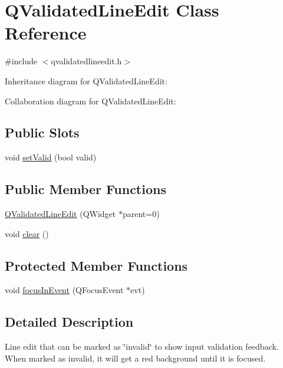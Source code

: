 \hypertarget{class_q_validated_line_edit}{}\section{Q\+Validated\+Line\+Edit Class Reference}
\label{class_q_validated_line_edit}


{\ttfamily \#include $<$qvalidatedlineedit.\+h$>$}



Inheritance diagram for Q\+Validated\+Line\+Edit\+:


Collaboration diagram for Q\+Validated\+Line\+Edit\+:
\subsection*{Public Slots}
\begin{DoxyCompactItemize}
\item 
void \hyperlink{class_q_validated_line_edit_ad9984e2e463cc7fbf28fe334498a1df5}{set\+Valid} (bool valid)
\end{DoxyCompactItemize}
\subsection*{Public Member Functions}
\begin{DoxyCompactItemize}
\item 
\hyperlink{class_q_validated_line_edit_a1d739b7cf9a4ed066bb73decf374293f}{Q\+Validated\+Line\+Edit} (Q\+Widget $\ast$parent=0)
\item 
void \hyperlink{class_q_validated_line_edit_aee2a648f6f4904f21e55871afbddefa9}{clear} ()
\end{DoxyCompactItemize}
\subsection*{Protected Member Functions}
\begin{DoxyCompactItemize}
\item 
void \hyperlink{class_q_validated_line_edit_a914d4efae9ac7c74faa3a4a82d26fec3}{focus\+In\+Event} (Q\+Focus\+Event $\ast$evt)
\end{DoxyCompactItemize}


\subsection{Detailed Description}
Line edit that can be marked as \char`\"{}invalid\char`\"{} to show input validation feedback. When marked as invalid, it will get a red background until it is focused. 

